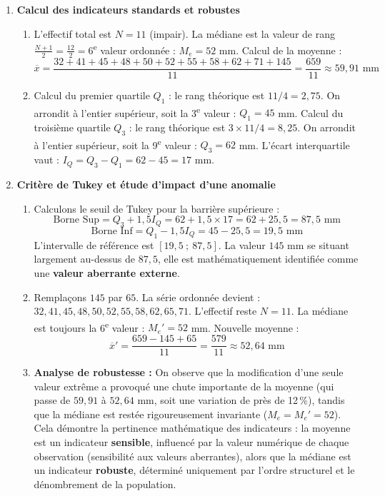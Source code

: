 \documentclass[11pt,a4paper]{article}
\begin{document}
\begin{enumerate}
    \item \textbf{Calcul des indicateurs standards et robustes}
    \begin{enumerate}
        \item L'effectif total est $N = 11$ (impair). 
        La médiane est la valeur de rang $\frac{N+1}{2} = \frac{12}{2} = 6$\textsuperscript{e} valeur ordonnée : $M_e = 52$ mm.
        Calcul de la moyenne :
        \[ \overline{x} = \frac{32+41+45+48+50+52+55+58+62+71+145}{11} = \frac{659}{11} \approx 59,91 \text{ mm} \]
        
        \item Calcul du premier quartile $Q_1$ : le rang théorique est $11/4 = 2,75$. On arrondit à l'entier supérieur, soit la 3\textsuperscript{e} valeur : $Q_1 = 45$ mm.
        Calcul du troisième quartile $Q_3$ : le rang théorique est $3 \times 11 / 4 = 8,25$. On arrondit à l'entier supérieur, soit la 9\textsuperscript{e} valeur : $Q_3 = 62$ mm.
        L'écart interquartile vaut : $I_Q = Q_3 - Q_1 = 62 - 45 = 17$ mm.
    \end{enumerate}

    \item \textbf{Critère de Tukey et étude d'impact d'une anomalie}
    \begin{enumerate}
        \item Calculons le seuil de Tukey pour la barrière supérieure :
        \[ \text{Borne Sup} = Q_3 + 1,5 I_Q = 62 + 1,5 \times 17 = 62 + 25,5 = 87,5 \text{ mm} \]
        \[ \text{Borne Inf} = Q_1 - 1,5 I_Q = 45 - 25,5 = 19,5 \text{ mm} \]
        L'intervalle de référence est $[19,5 \ ; \ 87,5]$. La valeur $145$ mm se situant largement au-dessus de $87,5$, elle est mathématiquement identifiée comme une \textbf{valeur aberrante externe}.
        
        \item Remplaçons $145$ par $65$. La série ordonnée devient : $32, 41, 45, 48, 50, 52, 55, 58, 62, 65, 71$.
        L'effectif reste $N=11$. La médiane est toujours la 6\textsuperscript{e} valeur : $M_e' = 52$ mm.
        Nouvelle moyenne :
        \[ \overline{x}' = \frac{659 - 145 + 65}{11} = \frac{579}{11} \approx 52,64 \text{ mm} \]
        
        \item \textbf{Analyse de robustesse :} On observe que la modification d'une seule valeur extrême a provoqué une chute importante de la moyenne (qui passe de $59,91$ à $52,64$ mm, soit une variation de près de 12\,\%), tandis que la médiane est restée rigoureusement invariante ($M_e = M_e' = 52$). 
        Cela démontre la pertinence mathématique des indicateurs : la moyenne est un indicateur \textbf{sensible}, influencé par la valeur numérique de chaque observation (sensibilité aux valeurs aberrantes), alors que la médiane est un indicateur \textbf{robuste}, déterminé uniquement par l'ordre structurel et le dénombrement de la population.
    \end{enumerate}
\end{enumerate}
\end{document}
